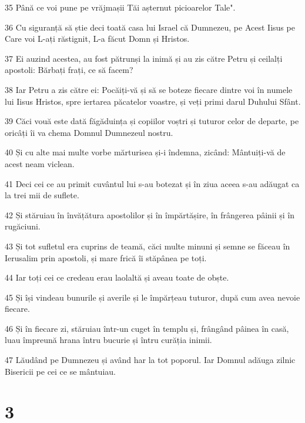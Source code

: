 \par 35 Până ce voi pune pe vrăjmașii Tăi așternut picioarelor Tale".
\par 36 Cu siguranță să știe deci toată casa lui Israel că Dumnezeu, pe Acest Iisus pe Care voi L-ați răstignit, L-a făcut Domn și Hristos.
\par 37 Ei auzind acestea, au fost pătrunși la inimă și au zis către Petru și ceilalți apostoli: Bărbați frați, ce să facem?
\par 38 Iar Petru a zis către ei: Pocăiți-vă și să se boteze fiecare dintre voi în numele lui Iisus Hristos, spre iertarea păcatelor voastre, și veți primi darul Duhului Sfânt.
\par 39 Căci vouă este dată făgăduința și copiilor voștri și tuturor celor de departe, pe oricâți îi va chema Domnul Dumnezeul nostru.
\par 40 Și cu alte mai multe vorbe mărturisea și-i îndemna, zicând: Mântuiți-vă de acest neam viclean.
\par 41 Deci cei ce au primit cuvântul lui s-au botezat și în ziua aceea s-au adăugat ca la trei mii de suflete.
\par 42 Și stăruiau în învățătura apostolilor și în împărtășire, în frângerea pâinii și în rugăciuni.
\par 43 Și tot sufletul era cuprins de teamă, căci multe minuni și semne se făceau în Ierusalim prin apostoli, și mare frică îi stăpânea pe toți.
\par 44 Iar toți cei ce credeau erau laolaltă și aveau toate de obște.
\par 45 Și își vindeau bunurile și averile și le împărțeau tuturor, după cum avea nevoie fiecare.
\par 46 Și în fiecare zi, stăruiau într-un cuget în templu și, frângând pâinea în casă, luau împreună hrana întru bucurie și întru curăția inimii.
\par 47 Lăudând pe Dumnezeu și având har la tot poporul. Iar Domnul adăuga zilnic Bisericii pe cei ce se mântuiau.

\chapter{3}

